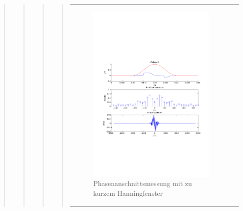 \begin{quote}
\begin{quote}
\begin{quote}
\begin{quote}
\begin{center}
\begin{tabular}{ll}
\begin{minipage}{0.6\textwidth}
                    \end{minipage}
                    \begin{minipage}{0.6\textwidth}
    
                         \begin{figure}[H]
                            \label{fig:}
                            \includegraphics[scale=0.4, trim = 1.5cm 7cm 1.5cm 8cm,
                            clip]{./Bilder/Phasenanschnittsmessungmithanningfensterleckeffekt} %
                            \caption{Phasenanschnittsmessung mit zu kurzem Hanningfenster}
                        \end{figure}
                   \vspace{-1.5em}
    
                    \end{minipage}
    

\end{tabular}
\end{center}
\end{quote}
\end{quote}
\end{quote}
\end{quote}
